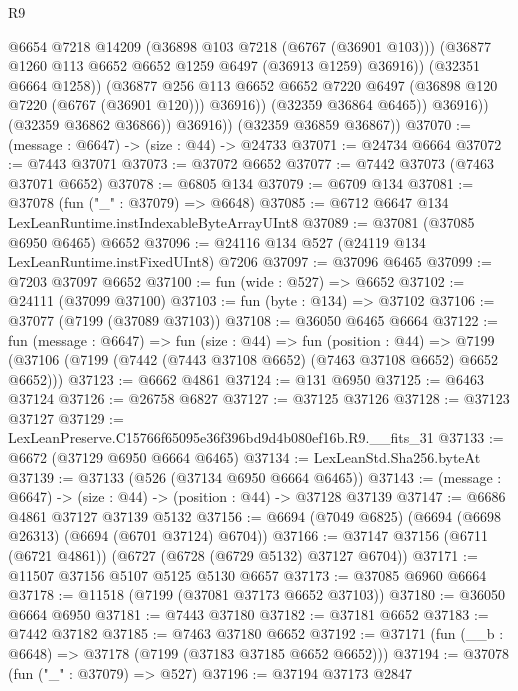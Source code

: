 \begin{lexlean}{R9}
\begin{coremodule}
                        @6654
                        @7218
                        @14209
                        (@36898 @103 @7218 (@6767 (@36901 @103)))
                        (@36877 @1260 @113 @6652 @6652 @1259 @6497 (@36913 @1259) @36916))
                      (@32351 @6664 @1258))
                    (@36877
                      @256
                      @113
                      @6652
                      @6652
                      @7220
                      @6497
                      (@36898 @120 @7220 (@6767 (@36901 @120)))
                      @36916))
                  (@32359 @36864 @6465))
                @36916))
            (@32359 @36862 @36866))
          @36916))
      (@32359 @36859 @36867))
@37070 := (message : @6647) -> (size : @44) -> @24733
@37071 := @24734 @6664
@37072 := @7443 @37071
@37073 := @37072 @6652
@37077 := @7442 @37073 (@7463 @37071 @6652)
@37078 := @6805 @134
@37079 := @6709 @134
@37081 := @37078 (fun ("_" : @37079) => @6648)
@37085 := @6712 @6647 @134 LexLeanRuntime.instIndexableByteArrayUInt8
@37089 := @37081 (@37085 @6950 @6465) @6652
@37096 := @24116 @134 @527 (@24119 @134 LexLeanRuntime.instFixedUInt8) @7206
@37097 := @37096 @6465
@37099 := @7203 @37097 @6652
@37100 := fun (wide : @527) => @6652
@37102 := @24111 (@37099 @37100)
@37103 := fun (byte : @134) => @37102
@37106 := @37077 (@7199 (@37089 @37103))
@37108 := @36050 @6465 @6664
@37122 := fun (message : @6647) =>
  fun (size : @44) =>
  fun (position : @44) =>
  @7199 (@37106 (@7199 (@7442 (@7443 @37108 @6652) (@7463 @37108 @6652) @6652 @6652)))
@37123 := @6662 @4861
@37124 := @131 @6950
@37125 := @6463 @37124
@37126 := @26758 @6827
@37127 := @37125 @37126
@37128 := @37123 @37127
@37129 := LexLeanPreserve.C15766f65095e36f396bd9d4b080ef16b.R9.__fits_31
@37133 := @6672 (@37129 @6950 @6664 @6465)
@37134 := LexLeanStd.Sha256.byteAt
@37139 := @37133 (@526 (@37134 @6950 @6664 @6465))
@37143 := (message : @6647) -> (size : @44) -> (position : @44) -> @37128 @37139
@37147 := @6686 @4861 @37127 @37139 @5132
@37156 := @6694 (@7049 @6825) (@6694 (@6698 @26313) (@6694 (@6701 @37124) @6704))
@37166 := @37147 @37156 (@6711 (@6721 @4861)) (@6727 (@6728 (@6729 @5132) @37127 @6704))
@37171 := @11507 @37156 @5107 @5125 @5130 @6657
@37173 := @37085 @6960 @6664
@37178 := @11518 (@7199 (@37081 @37173 @6652 @37103))
@37180 := @36050 @6664 @6950
@37181 := @7443 @37180
@37182 := @37181 @6652
@37183 := @7442 @37182
@37185 := @7463 @37180 @6652
@37192 := @37171 (fun (__b : @6648) => @37178 (@7199 (@37183 @37185 @6652 @6652)))
@37194 := @37078 (fun ("_" : @37079) => @527)
@37196 := @37194 @37173 @2847

\end{coremodule}
\end{lexlean}
